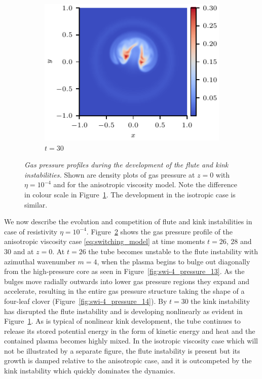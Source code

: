 \documentclass[fleqn,usenatbib]{mnras}
\newcommand{\rev}[1]{{\color{red} {#1}}}
\newcommand{\newold}[2]{{#1}{}}
\newcommand{\mycaption}[2]{\caption[#1]{\emph{#1} #2}}
\begin{document}
\begin{figure}
\begin{subfigure}{0.32\textwidth}
      \includegraphics[width=\linewidth]{swi-4_pressure_15.pdf}
      \caption{$t=30$}
      \label{fig:swi-4_pressure_15}
    \end{subfigure}
\mycaption{\rev{Gas pressure} profiles during the development of the flute and kink
instabilities.}{Shown are density plots of \rev{gas} pressure at $z=0$ with $\eta
= 10^{-4}$ and for the anisotropic viscosity model. Note the difference in
colour scale in Figure~\ref{fig:swi-4_pressure_15}. The development in the
isotropic case is similar.}
\label{fig:kink_pressure_slices-4}%
\end{figure}

We now describe the evolution and competition of flute and kink instabilities
in case of resistivity $\eta=10^{-4}$. Figure~\ref{fig:kink_pressure_slices-4}
shows the \rev{gas} pressure profile of the anisotropic viscosity case
\eqref{eq:switching_model} at time moments $t=26$, $28$ and $30$ and at $z=0$.
At $t=26$ the tube becomes unstable \rev{to the flute instability} with azimuthal
wavenumber $m=4$, when the plasma begins to  bulge out diagonally from the
high-pressure core as seen in Figure~\ref{fig:swi-4_pressure_13}. As  the
bulges move radially outwards into lower \rev{gas} pressure regions they expand and
accelerate, resulting in the entire \rev{gas} pressure structure \rev{\newold{}{appearing}} taking the
shape of a four-leaf clover (Figure~\ref{fig:swi-4_pressure_14}). By $t=30$ the
kink instability has disrupted the flute instability and is developing
nonlinearly as evident in Figure~\ref{fig:swi-4_pressure_15}. As is typical of
nonlinear kink development, the tube continues to release its stored potential
energy in the form of kinetic energy and heat and the contained plasma becomes
highly mixed. In the  isotropic viscosity case which will not be illustrated by
a separate figure, the flute instability is present but \rev{its
 growth is damped relative to the anisotropic case}, and it is 
outcompeted by the kink instability which quickly dominates the dynamics. 
\end{document}
